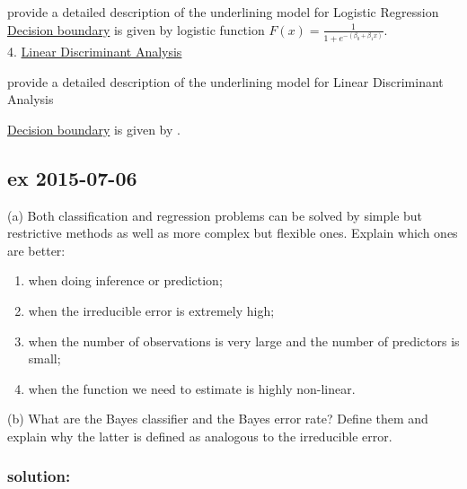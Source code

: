\documentclass[a4paper,12pt,titlepage]{article} %
\begin{document}
provide a detailed description of the underlining model for Logistic Regression \\

\underline{Decision boundary} is given by logistic function $ F(x) = \frac {1}{1+e^{-(\beta _{0}+\beta _{1}x)}} $.\\

4. \underline{Linear Discriminant Analysis}

provide a detailed description of the underlining model for Linear Discriminant Analysis

\underline{Decision boundary} is given by .\\


\newpage
\subsection{ex 2015-07-06}
(a) Both classification and regression problems can be solved by simple but restrictive methods as well as more complex but flexible ones. Explain which ones are better:
\begin{enumerate}
\item when doing inference or prediction;
\item when the irreducible error is extremely high;
\item when the number of observations is very large and the number of predictors is small;
\item when the function we need to estimate is highly non-linear.
\end{enumerate}
(b) What are the Bayes classifier and the Bayes error rate? Define them and explain why the latter is defined as analogous to the irreducible error.

\subsubsection{solution:}


\newpage
\end{document}
